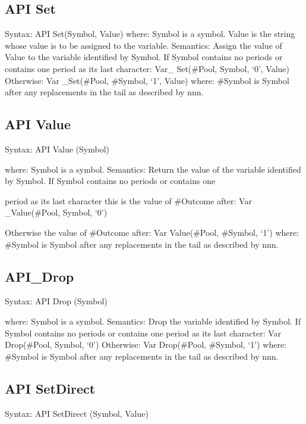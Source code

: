 \hypertarget{api-set}{%
\subsection{API Set}\label{api-set}}

Syntax: API Set(Symbol, Value) where: Symbol is a symbol. Value is the
string whose value is to be assigned to the variable. Semantics: Assign
the value of Value to the variable identified by Symbol. If Symbol
contains no periods or contains one period as its last character: Var\_
Set(\#Pool, Symbol, `0', Value) Otherwise: Var \_Set(\#Pool, \#Symbol,
`1', Value) where: \#Symbol is Symbol after any replacements in the tail
as described by nnn.

\hypertarget{api-value}{%
\subsection{API Value}\label{api-value}}

Syntax: API Value (Symbol)

where: Symbol is a symbol. Semantics: Return the value of the variable
identified by Symbol. If Symbol contains no periods or contains one

period as its last character this is the value of \#Outcome after: Var
\_Value(\#Pool, Symbol, `0')

Otherwise the value of \#Outcome after: Var Value(\#Pool, \#Symbol, `1')
where: \#Symbol is Symbol after any replacements in the tail as
described by nnn.

\hypertarget{api_drop}{%
\subsection{API\_Drop}\label{api_drop}}

Syntax: API Drop (Symbol)

where: Symbol is a symbol. Semantics: Drop the variable identified by
Symbol. If Symbol contains no periods or contains one period as its last
character: Var Drop(\#Pool, Symbol, `0') Otherwise: Var Drop(\#Pool,
\#Symbol, `1') where: \#Symbol is Symbol after any replacements in the
tail as described by nnn.

\hypertarget{api-setdirect}{%
\subsection{API SetDirect}\label{api-setdirect}}

Syntax: API SetDirect (Symbol, Value)

